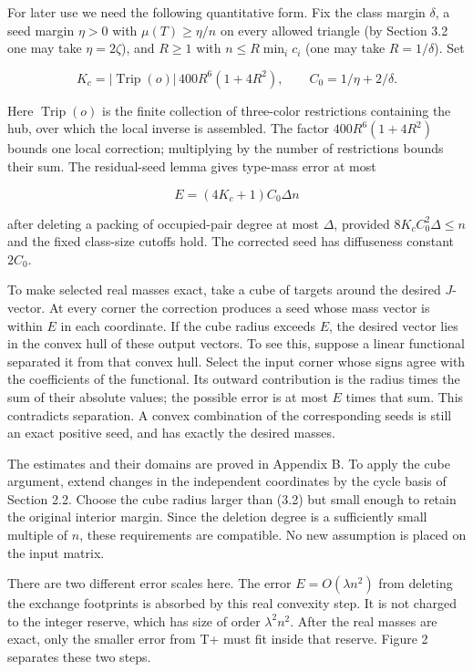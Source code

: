 \documentclass[english,11pt,a4paper]{article}
\begin{document}
For later use we need the following quantitative form. Fix the class margin \(\delta\), a seed margin \(\eta>0\) with \(\mu(T)\ge\eta/n\) on every allowed triangle (by Section 3.2 one may take \(\eta=2\zeta\)), and \(R\ge1\) with \(n\le R\min_ic_i\) (one may take \(R=1/\delta\)). Set

\[K_c=|\operatorname{Trip}(o)|\,400R^6(1+4R^2),\qquad C_0=1/\eta+2/\delta.\]

Here \(\operatorname{Trip}(o)\) is the finite collection of three-color restrictions containing the hub, over which the local inverse is assembled. The factor \(400R^6(1+4R^2)\) bounds one local correction; multiplying by the number of restrictions bounds their sum. The residual-seed lemma gives type-mass error at most

\[E=(4K_c+1)C_0\Delta n\tag{3.2}\]

after deleting a packing of occupied-pair degree at most \(\Delta\), provided \(8K_cC_0^2\Delta\le n\) and the fixed class-size cutoffs hold. The corrected seed has diffuseness constant \(2C_0\).

To make selected real masses exact, take a cube of targets around the desired \(J\)-vector. At every corner the correction produces a seed whose mass vector is within \(E\) in each coordinate. If the cube radius exceeds \(E\), the desired vector lies in the convex hull of these output vectors. To see this, suppose a linear functional separated it from that convex hull. Select the input corner whose signs agree with the coefficients of the functional. Its outward contribution is the radius times the sum of their absolute values; the possible error is at most \(E\) times that sum. This contradicts separation. A convex combination of the corresponding seeds is still an exact positive seed, and has exactly the desired masses.

The estimates and their domains are proved in Appendix B. To apply the cube argument, extend changes in the independent coordinates by the cycle basis of Section 2.2. Choose the cube radius larger than (3.2) but small enough to retain the original interior margin. Since the deletion degree is a sufficiently small multiple of \(n\), these requirements are compatible. No new assumption is placed on the input matrix.

There are two different error scales here. The error \(E=O(\lambda n^2)\) from deleting the exchange footprints is absorbed by this real convexity step. It is not charged to the integer reserve, which has size of order \(\lambda^2n^2\). After the real masses are exact, only the smaller error from T+ must fit inside that reserve. Figure 2 separates these two steps.
\end{document}

